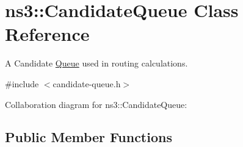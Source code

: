 \hypertarget{classns3_1_1CandidateQueue}{}\section{ns3\+:\+:Candidate\+Queue Class Reference}
\label{classns3_1_1CandidateQueue}


A Candidate \hyperlink{classns3_1_1Queue}{Queue} used in routing calculations.  




{\ttfamily \#include $<$candidate-\/queue.\+h$>$}



Collaboration diagram for ns3\+:\+:Candidate\+Queue\+:
\subsection*{Public Member Functions}
